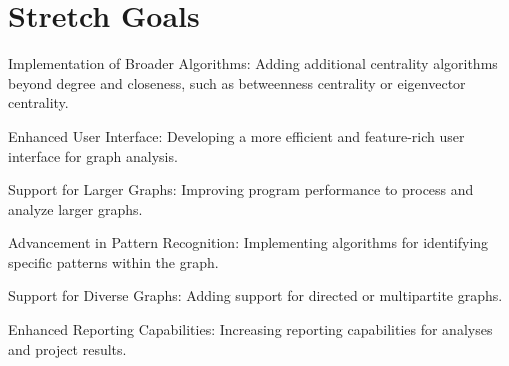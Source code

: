 \documentclass{article}
\begin{document}
\section{Stretch Goals}

Implementation of Broader Algorithms: Adding additional centrality algorithms beyond degree and closeness, such as betweenness centrality or eigenvector centrality.

Enhanced User Interface: Developing a more efficient and feature-rich user interface for graph analysis.

Support for Larger Graphs: Improving program performance to process and analyze larger graphs.

Advancement in Pattern Recognition: Implementing algorithms for identifying specific patterns within the graph.

Support for Diverse Graphs: Adding support for directed or multipartite graphs.

Enhanced Reporting Capabilities: Increasing reporting capabilities for analyses and project results.
\end{document}
